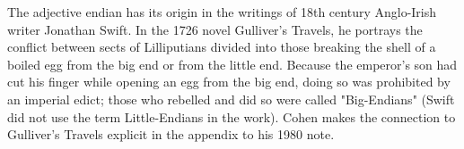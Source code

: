 \documentclass[11pt]{book}
\begin{document}
The adjective endian has its origin in the writings of 18th century Anglo-Irish writer Jonathan Swift. In the 1726 novel Gulliver's Travels, he portrays the conflict between sects of Lilliputians divided into those breaking the shell of a boiled egg from the big end or from the little end. Because the emperor's son had cut his finger while opening an egg from the big end, doing so was prohibited by an imperial edict; those who rebelled and did so were called "Big-Endians" (Swift did not use the term Little-Endians in the work). Cohen makes the connection to Gulliver's Travels explicit in the appendix to his 1980 note. 
\end{document}

